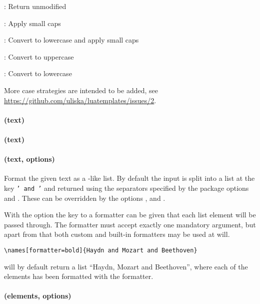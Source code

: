 \documentclass{scrartcl}
\begin{document}
\begin{itemize*}
\item {}: Return unmodified
\item {}: Apply small caps
\item {}: Convert to lowercase and apply small caps
\item {}: Convert to uppercase
\item {}: Convert to lowercase
\end{itemize*}

More case strategies are intended to be added, see
\url{https://github.com/uliska/luatemplates/issues/2}.

\paragraph{ (text)}

\paragraph{ (text)}

\paragraph{ (text, options)}

Format the given text as a -like list.  By default the input
is split into a list at the key \texttt{' and '} and returned using the
separators specified by the package options  and
.  These can be overridden by the options
,  and .

With the option  the key to a formatter can be given that each
list element will be passed through.  The formatter must accept exactly one
mandatory argument, but apart from that both custom and built-in formatters may
be used at will.

\begin{verbatim}
\names[formatter=bold]{Haydn and Mozart and Beethoven}
\end{verbatim}

\noindent will by default return a list “Haydn, Mozart and Beethoven”, where
each of the elements has been formatted with the  formatter.


\paragraph{ (elements, options)}
\end{document}
